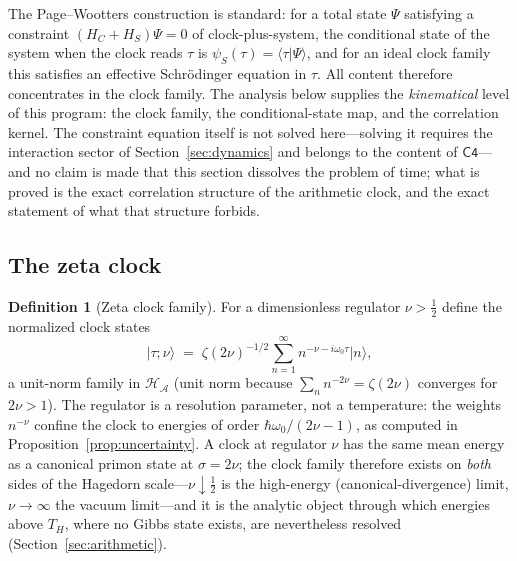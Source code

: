 \documentclass[11pt,a4paper]{article}
\theoremstyle{plain}
\theoremstyle{definition}
\newtheorem{definition}[theorem]{Definition}
\theoremstyle{remark}
\newcommand{\ket}[1]{\lvert #1\rangle}
\newcommand{\bra}[1]{\langle #1\rvert}
\newcommand{\Hil}{\mathcal{H}}
\begin{document}
The Page--Wootters construction is standard: for a total state $\Psi$ satisfying a constraint
$(H_{C}+H_{S})\Psi=0$ of clock-plus-system, the conditional state of the system when the
clock reads $\tau$ is $\psi_{S}(\tau)=\bra{\tau}\Psi\rangle$, and for an ideal clock family
this satisfies an effective Schr{\"o}dinger equation in $\tau$. All content therefore
concentrates in the clock family. The analysis below supplies the \emph{kinematical} level of
this program: the clock family, the conditional-state map, and the correlation kernel. The
constraint equation itself is not solved here---solving it requires the interaction sector of
Section~\ref{sec:dynamics} and belongs to the content of $\mathsf{C4}$---and no claim is made
that this section dissolves the problem of time; what is proved is the exact correlation
structure of the arithmetic clock, and the exact statement of what that structure forbids.

\subsection{The zeta clock}

\begin{definition}[Zeta clock family]\label{def:clock}
For a dimensionless regulator $\nu>\tfrac12$ define the normalized clock states
\begin{equation}\label{eq:clockstates}
\ket{\tau;\nu}\;=\;\zeta(2\nu)^{-1/2}\sum_{n=1}^{\infty}n^{-\nu-i\omega_{0}\tau}\ket{n},
\end{equation}
a unit-norm family in $\Hil_{\mathcal{A}}$ (unit norm because $\sum_{n}n^{-2\nu}=\zeta(2\nu)$
converges for $2\nu>1$). The regulator is a resolution parameter, not a temperature: the
weights $n^{-\nu}$ confine the clock to energies of order
$\hbar\omega_{0}/(2\nu-1)$, as computed in Proposition~\ref{prop:uncertainty}. A clock at
regulator $\nu$ has the same mean energy as a canonical primon state at $\sigma=2\nu$; the
clock family therefore exists on \emph{both} sides of the Hagedorn scale---$\nu\downarrow\tfrac12$
is the high-energy (canonical-divergence) limit, $\nu\to\infty$ the vacuum limit---and it is
the analytic object through which energies above $T_{H}$, where no Gibbs state exists, are
nevertheless resolved (Section~\ref{sec:arithmetic}).
\end{definition}
\end{document}
